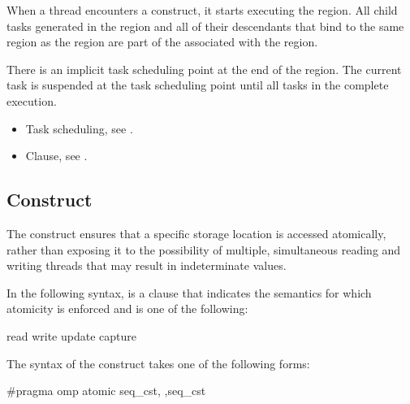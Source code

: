 {{{{\descr
When a thread encounters a  construct, it starts executing 
the region. All child tasks generated in the  region and all 
of their descendants that bind to the same  region as the 
 region are part of the  associated with 
the  region.

There is an implicit task scheduling point at the end of the  
region. The current task is suspended at the task scheduling point until all 
tasks in the  complete execution.

\crossreferences
\begin{itemize}
\item Task scheduling, see 
.
\item {} Clause, see .
\end{itemize}










\subsection{ Construct}
\label{subsec:atomic Construct}
\summary
The  construct ensures that a specific storage location is accessed atomically, 
rather than exposing it to the possibility of multiple, simultaneous reading and writing 
threads that may result in indeterminate values.

\syntax
In the following syntax,  is a clause that indicates
the semantics for which atomicity is enforced and is one of the following:

\begin{indentedcodelist}
read
write
update
capture
\end{indentedcodelist}

\ccppspecificstart
The syntax of the  construct takes one of the following forms:

\begin{boxedcode}
\#pragma omp atomic \plc{[}seq\_cst\plc{[},\plc{]]}  \plc{[[},\plc{]}seq\_cst\plc{]} 
\end{boxedcode}

}}}}
